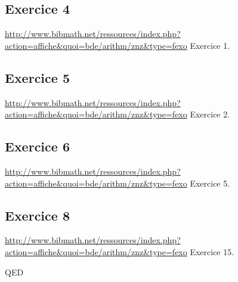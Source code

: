 \documentclass[]{book}
\theoremstyle{definition}
\begin{document}
\subsection*{Exercice 4}
\url{http://www.bibmath.net/ressources/index.php?action=affiche&quoi=bde/arithm/znz&type=fexo}
Exercice 1.

\subsection*{Exercice 5}
\url{http://www.bibmath.net/ressources/index.php?action=affiche&quoi=bde/arithm/znz&type=fexo}
Exercice 2.

\subsection*{Exercice 6}
\url{http://www.bibmath.net/ressources/index.php?action=affiche&quoi=bde/arithm/znz&type=fexo}
Exercice 5.


\subsection*{Exercice 8}
\url{http://www.bibmath.net/ressources/index.php?action=affiche&quoi=bde/arithm/znz&type=fexo}
Exercice 15.


QED
\end{document}
